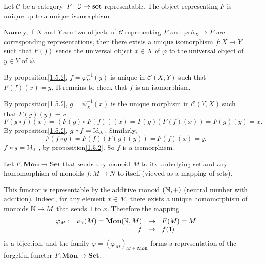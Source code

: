 \begin{corollaryenv}
    Let $\mathcal{C}$ be a category, $F:\mathcal{C}\rightarrow \mathbf{set}$ representable.
    The object representing $F$ is unique up to a unique isomorphism.
    
    \quad Namely, if $X$ and $Y$ are two objects of $\mathcal{C}$ representing $F$ and $\varphi:h_X\rightarrow F$ are corresponding representations, then there exists a unique isomorphism $f:X\rightarrow Y$ such that $F(f)$ sends the universal object $x\in X$ of $\varphi$ to the universal object of $y\in Y$ of $\psi$.
\end{corollaryenv}
\begin{proofenv}
    By proposition\ref{1.5.2}, $f = \varphi_Y^{-1}(y)$ is unique in $\mathcal{C}(X,Y)$ such that $F(f)(x) = y$. It remains to check that $f$ is an isomorphism. 
    
    \quad By proposition\ref{1.5.2}, $g = \psi^{-1}_{X}(x)$ is the unique morphism in $\mathcal{C}(Y,X)$ such that $F(g)(y) = x$.
    $$
    F\left(g\circ f\right)(x) = \left(F(g)\circ F(f)\right)(x) = F(g)\left(F(f)(x)\right) = F(g)(y) = x.
    $$
    By proposition\ref{1.5.2}, $g\circ f = \operatorname{\mathrm{Id}}_X$. Similarly, 
    $$
    F\left(f\circ g\right) = F(f)\left(F(g)(y)\right) = F(f)(x) = y.
    $$
    $f\circ g = \operatorname{\mathrm{Id}}_Y$, by proposition\ref{1.5.2}. So $f$ is a isomorphism.
\end{proofenv}
\begin{exampleenv}
    Let $F:\mathbf{Mon}\rightarrow\mathbf{Set}$ that sends any monoid $M$ to its underlying set and any homomorphism of monoids $f:M\rightarrow N$ to itself (viewed as a mapping of sets).

    \quad This functor is representable by the additive monoid $(\mathbb{N},+)$ (neutral number with addition). Indeed, for any element $x\in M$, there exists a unique homomorphism of monoids $\mathbb{N}\rightarrow M$ that sends $1$ to $x$. Therefore the mapping
    $$ \begin{array}{rrcl}
        \varphi_{M} :& h_{\mathbb{N}}(M) = \mathbf{Mon}(\mathbb{N},M) &\rightarrow & F(M) = M\\
        & f & \mapsto &f(1)
    \end{array}
    $$
    is a bijection, and the family $\varphi = \left(\varphi_M\right)_{M\in \mathbf{Mon}}$ forms a representation of the forgetful functor $F:\mathbf{Mon} \rightarrow\mathbf{Set}$.
\end{exampleenv}
